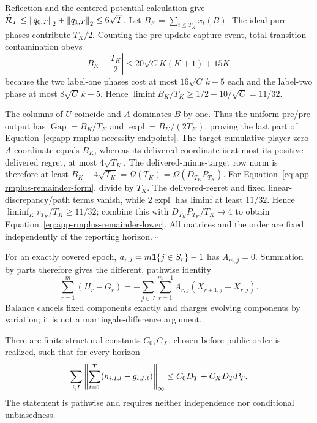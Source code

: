 Reflection and the centered-potential calculation give
$\widehat{\mathcal R}_T\le\left\lVert q_{0,T} \right\rVert_2+
\left\lVert q_{1,T} \right\rVert_2\le6\sqrt T$.  Let
$B_K=\sum_{t\le T_K}x_t(B)$.  The ideal pure phases contribute $T_K/2$.
Counting the pre-update capture event, total transition contamination obeys
\begin{equation}
\left|B_K-\frac{T_K}{2}\right|
\le20\sqrt C K(K+1)+15K,
\label{eq:app-necessity-contamination}
\end{equation}
because the two label-one phases cost at most $16\sqrt{C}\,k+5$ each and the
label-two phase at most $8\sqrt{C}\,k+5$.  Hence
$\liminf B_K/T_K\ge1/2-10/\sqrt C=11/32$.

The columns of $\bar U$ coincide and $A$ dominates $B$ by one.  Thus the
uniform pre/pre output has
$\operatorname{Gap}=B_K/T_K$ and
$\operatorname{expl}=B_K/(2T_K)$, proving the last part of
Equation~\ref{eq:app-rmplus-necessity-endpoints}.  The target cumulative
player-zero $A$-coordinate equals $B_K$, whereas its delivered coordinate is
at most its positive delivered regret, at most $4\sqrt{T_K}$.  The
delivered-minus-target row norm is therefore at least
$B_K-4\sqrt{T_K}=\Omega(T_K)=\Omega(D_{T_K}P_{T_K})$.
For Equation~\ref{eq:app-rmplus-remainder-form}, divide by $T_K$.  The
delivered-regret and fixed linear-discrepancy/path terms vanish, while
$2\operatorname{expl}$ has liminf at least $11/32$.  Hence
$\liminf_K r_{T_K}/T_K\ge11/32$; combine this with
$D_{T_K}P_{T_K}/T_K\to4$ to obtain
Equation~\ref{eq:app-rmplus-remainder-lower}.  All matrices and the order are
fixed independently of the reporting horizon.
\hfill$\square$

For an exactly covered epoch, $a_{r,j}=m\mathbf 1\{j\in S_r\}-1$ has
$A_{m,j}=0$.  Summation by parts therefore gives the different, pathwise
identity
\begin{equation}
\sum_{r=1}^m(H_r-G_r)
=-\sum_{j\in J}\sum_{r=1}^{m-1}
A_{r,j}(X_{r+1,j}-X_{r,j}).
\label{eq:app-balance-pathwise}
\end{equation}
Balance cancels fixed components exactly and charges evolving components by
variation; it is not a martingale-difference argument.

\begin{lemma}
\label{lem:app-balanced-error}
There are finite structural constants $C_0,C_X$, chosen before public order
is realized, such that for every horizon
\begin{equation}
\sum_{i,I}\left\lVert \sum_{t=1}^T(h_{i,I,t}-g_{i,I,t}) \right\rVert_\infty
\le C_0D_T+C_XD_TP_T.
\label{eq:app-balanced-error}
\end{equation}
The statement is pathwise and requires neither independence nor conditional
unbiasedness.
\end{lemma}

